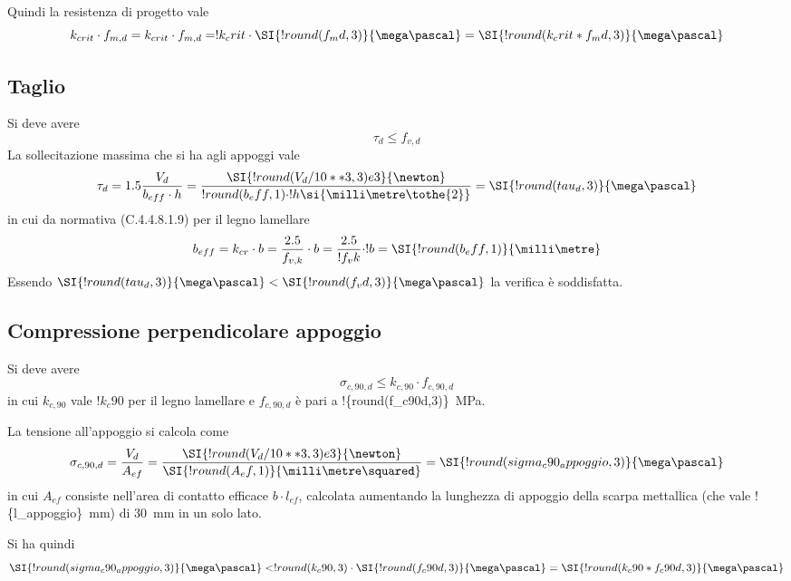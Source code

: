 \begin{pysub}[TraveSolaio]
Quindi la resistenza di progetto vale
\[
    k_{crit} \cdot f_{m,d} 
    = k_{crit} \cdot f_{m,d}
    = !{k_crit} \cdot \SI{!{round(f_md,3)}}{\mega\pascal}
    = \SI{!{round(k_crit * f_md,3)}}{\mega\pascal}
\]

\subsection{Taglio}
Si deve avere
\begin{equation}
    \tau_d \leq f_{v,d}   
\end{equation}
La sollecitazione massima che si ha agli appoggi vale
\[
\tau_d 
= 1.5 \frac{V_d}{b_{eff} \cdot h} 
= \frac{\SI{!{round(V_d/10**3,3)}e3}{\newton}} {!{round(b_eff,1)} \cdot !{h} \si{\milli\metre\tothe{2}}} 
= \SI{!{round(tau_d,3)}}{\mega\pascal} 
\]
in cui da normativa (C.4.4.8.1.9) per il legno lamellare 
\[
    b_{eff} 
    = k_{cr} \cdot b 
    = \dfrac{2.5}{f_{v,k}} \cdot b 
    = \dfrac{2.5}{!{f_vk}} \cdot !{b}
    = \SI{!{round(b_eff,1)}}{\milli\metre}
\]
Essendo $\SI{!{round(tau_d,3)}}{\mega\pascal} < \SI{!{round(f_vd,3)}}{\mega\pascal}$ la verifica è soddisfatta.

\subsection{Compressione perpendicolare appoggio}
Si deve avere 
\begin{equation}
    \sigma_{c,90,d} \leq k_{c,90} \cdot f_{c,90,d}
\end{equation}
in cui $k_{c,90}$ vale $!{k_c90}$ per il legno lamellare e $f_{c,90,d}$ è pari a \SI{!{round(f_c90d,3)}}{\mega\pascal}.

La tensione all'appoggio si calcola come
\[
    \sigma_{c,90,d} = \frac{V_d}{A_{ef}} = \frac{\SI{!{round(V_d/10**3,3)}e3}{\newton}}{\SI{!{round(A_ef,1)}}{\milli\metre\squared}} = \SI{!{round(sigma_c90_appoggio,3)}}{\mega\pascal}
\]
in cui $A_{ef}$ consiste nell'area di contatto efficace $b \cdot l_{ef}$, calcolata aumentando la lunghezza di appoggio della scarpa mettallica (che vale \SI{!{l_appoggio}}{\milli\metre}) di \SI{30}{\milli\metre} in un solo lato.

Si ha quindi
\[
    \SI{!{round(sigma_c90_appoggio,3)}}{\mega\pascal} <  !{round(k_c90,3)} \cdot \SI{!{round(f_c90d,3)}}{\mega\pascal} = \SI{!{round(k_c90 * f_c90d,3)}}{\mega\pascal}
\]


\end{pysub}

